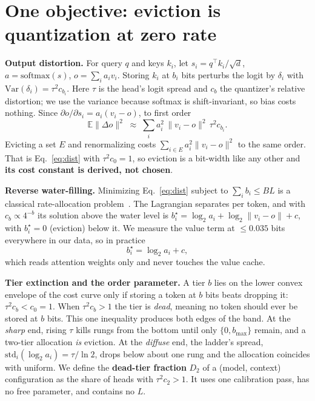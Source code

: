 \documentclass{article} %
\theoremstyle{definition}
\begin{document}
\section{One objective: eviction is quantization at zero rate}
\label{sec:framework}

\textbf{Output distortion.} For query $q$ and keys $k_i$, let $s_i=q^\top k_i/\sqrt d$, $a=\mathrm{softmax}(s)$, $o=\sum_ia_iv_i$. Storing $k_i$ at $b_i$ bits perturbs the logit by $\delta_i$ with $\mathrm{Var}(\delta_i)=\tau^2c_{b_i}$. Here $\tau$ is the head's logit spread and $c_b$ the quantizer's relative distortion; we use the variance because softmax is shift-invariant, so bias costs nothing. Since $\partial o/\partial s_i=a_i(v_i-o)$, to first order
\begin{equation}
  \mathbb{E}\|\Delta o\|^2 \;\approx\; \textstyle\sum_i a_i^2\,\|v_i-o\|^2\,\tau^2c_{b_i}.
  \label{eq:dist}
\end{equation}
Evicting a set $E$ and renormalizing costs $\sum_{i\in E}a_i^2\|v_i-o\|^2$ to the same order. That is Eq.~\ref{eq:dist} with $\tau^2c_0=1$, so eviction is a bit-width like any other and \textbf{its cost constant is derived, not chosen}.

\textbf{Reverse water-filling.} Minimizing Eq.~\ref{eq:dist} subject to $\sum_ib_i\le BL$ is a classical rate-allocation problem~\citep{cover2006elements}. The Lagrangian separates per token, and with $c_b\propto 4^{-b}$ its solution above the water level is $b_i^\star=\log_2a_i+\log_2\|v_i-o\|+c$, with $b_i^\star=0$ (eviction) below it. We measure the value term at $\le0.035$ bits everywhere in our data, so in practice
\begin{equation}
  b_i^\star=\log_2 a_i + c ,
  \label{eq:rule}
\end{equation}
which reads attention weights only and never touches the value cache.

\textbf{Tier extinction and the order parameter.} A tier $b$ lies on the lower convex envelope of the cost curve only if storing a token at $b$ bits beats dropping it: $\tau^2c_b<c_0=1$. When $\tau^2c_b>1$ the tier is \emph{dead}, meaning no token should ever be stored at $b$ bits. This one inequality produces both edges of the band. At the \emph{sharp} end, rising $\tau$ kills rungs from the bottom until only $\{0,b_{\max}\}$ remain, and a two-tier allocation \emph{is} eviction. At the \emph{diffuse} end, the ladder's spread, $\mathrm{std}_i(\log_2a_i)=\tau/\ln2$, drops below about one rung and the allocation coincides with uniform. We define the \textbf{dead-tier fraction} $D_2$ of a (model, context) configuration as the share of heads with $\tau^2c_2>1$. It uses one calibration pass, has no free parameter, and contains no $L$.
\end{document}
